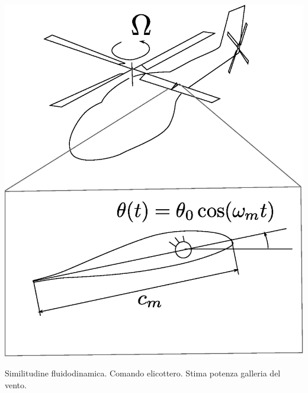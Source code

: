 \begin{minipage}[r]{0.5\textwidth}
 \centering
  \includegraphics[width=1.0\textwidth]{./fig/helicopter}
\end{minipage}

\sol

\partone
 Similitudine fluidodinamica. Comando elicottero. Stima potenza galleria del vento.

\parttwo

